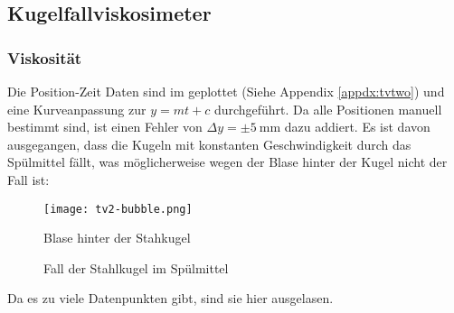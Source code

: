 \newpage
\newcommand{\rhok}[0]{\rho_\text{K}}
\subsection{Kugelfallviskosimeter}
	\subsubsection{Viskosität}
		Die Position-Zeit Daten sind im \gnuplot{} geplottet (Siehe Appendix \ref{appdx:tvtwo}) und eine Kurveanpassung zur $y = mt + c$ durchgeführt. Da alle Positionen manuell bestimmt sind, ist einen Fehler von $\Delta y = \pm \SI{5}{\milli\meter}$ dazu addiert. Es ist davon ausgegangen, dass die Kugeln mit konstanten Geschwindigkeit durch das Spülmittel fällt, was möglicherweise wegen der Blase hinter der Kugel nicht der Fall ist:
		\begin{figure}[H]
			\centering
			\captionsetup{width=0.8\linewidth, justification=centering}
			\texttt{[image: tv2-bubble.png]}
			\caption{Blase hinter der Stahkugel}
			\vspace{-1.25em}
			\label{fig:tv2-bubble}
		\end{figure}
		\begin{figure}[H]
			\centering
			\vspace{-1.25em}
			\captionsetup{width=0.8\textwidth, justification=centering}
			\resizebox{\linewidth}{!}{}
			\caption{Fall der Stahlkugel im Spülmittel }
			\vspace{-1em}
		\end{figure}
		Da es zu viele Datenpunkten gibt, sind sie hier ausgelasen. 

